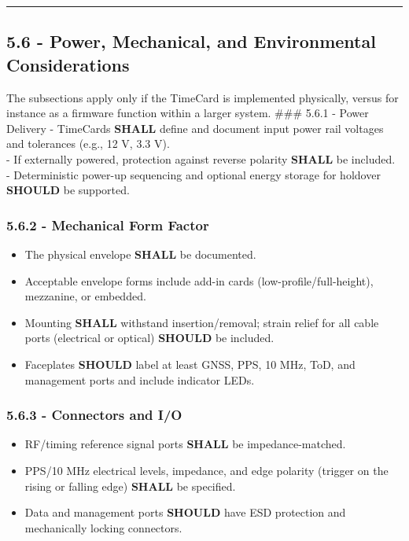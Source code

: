 \begin{center}\rule{0.5\linewidth}{0.5pt}\end{center}

\subsection{5.6 - Power, Mechanical, and Environmental
Considerations}\label{power-mechanical-and-environmental-considerations}

The subsections apply only if the TimeCard is implemented physically,
versus for instance as a firmware function within a larger system.
\#\#\# 5.6.1 - Power Delivery - TimeCards \textbf{SHALL} define and
document input power rail voltages and tolerances (e.g., 12 V, 3.3 V).\\
- If externally powered, protection against reverse polarity
\textbf{SHALL} be included.\\
- Deterministic power-up sequencing and optional energy storage for
holdover \textbf{SHOULD} be supported.

\subsubsection{5.6.2 - Mechanical Form
Factor}\label{mechanical-form-factor}

\begin{itemize}
\tightlist
\item
  The physical envelope \textbf{SHALL} be documented.\\
\item
  Acceptable envelope forms include add-in cards
  (low-profile/full-height), mezzanine, or embedded.\\
\item
  Mounting \textbf{SHALL} withstand insertion/removal; strain relief for
  all cable ports (electrical or optical) \textbf{SHOULD} be included.\\
\item
  Faceplates \textbf{SHOULD} label at least GNSS, PPS, 10 MHz, ToD, and
  management ports and include indicator LEDs.
\end{itemize}

\subsubsection{5.6.3 - Connectors and I/O}\label{connectors-and-io}

\begin{itemize}
\tightlist
\item
  RF/timing reference signal ports \textbf{SHALL} be
  impedance-matched.\\
\item
  PPS/10 MHz electrical levels, impedance, and edge polarity (trigger on
  the rising or falling edge) \textbf{SHALL} be specified.\\
\item
  Data and management ports \textbf{SHOULD} have ESD protection and
  mechanically locking connectors.
\end{itemize}

